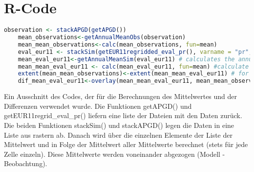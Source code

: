 \section{R-Code}
\begin{lstlisting}[language=R]
	observation <- stackAPGD(getAPGD())
	mean_observations<-getAnnualMeanObs(observation)
	mean_mean_observations<-calc(mean_observations, fun=mean)
	eval_eur11 <- stackSim(getEUR11regridded_eval_pr(), varname = "pr", factor = 3600*24) # factor for the precipitation-unit
	mean_eval_eur11<-getAnnualMeanSim(eval_eur11) # calculates the annual mean and places it in a raster (=>10years==10layers)
	mean_mean_eval_eur11 <- calc(mean_eval_eur11, fun=mean) #calculate the mean over all years
	extent(mean_mean_observations)<-extent(mean_mean_eval_eur11) # for better representation
	dif_mean_eval_eur11<-overlay(mean_mean_eval_eur11, mean_mean_observations,fun=function(x,y){return((x - y))}) #subtract each grid-cell
\end{lstlisting}
Ein Ausschnitt des Codes, der für die Berechnungen des Mittelwertes und der Differenzen verwendet wurde. Die Funktionen getAPGD() und getEUR11regrid\_eval\_pr() liefern eine liste der Dateien mit den Daten zurück. Die beiden Funktionen stackSim() und stackAPGD() legen die Daten in eine Liste aus rastern ab. Danach wird über die einzelnen Elemente der Liste der Mittelwert und in Folge der Mittelwert aller Mittelwerte berechnet (stets für jede Zelle einzeln). Diese Mittelwerte werden voneinander abgezogen (Modell - Beobachtung).